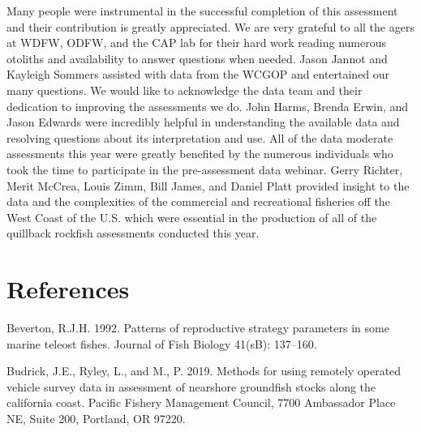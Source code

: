 \documentclass[11pt,
  english,
  letterpaper,
]{article}
\begin{document}
\leavevmode\tagmcend\tagstructend


Many people were instrumental in the successful completion of this assessment and their contribution is greatly appreciated. We are very grateful to all the agers at WDFW, ODFW, and the CAP lab for their hard work reading numerous otoliths and availability to answer questions when needed. Jason Jannot and Kayleigh Sommers assisted with data from the WCGOP and entertained our many questions. We would like to acknowledge the data team and their dedication to improving the assessments we do. John Harms, Brenda Erwin, and Jason Edwards were incredibly helpful in understanding the available data and resolving questions about its interpretation and use. All of the data moderate assessments this year were greatly benefited by the numerous individuals who took the time to participate in the pre-assessment data webinar. Gerry Richter, Merit McCrea, Louis Zimm, Bill James, and Daniel Platt provided insight to the data and the complexities of the commercial and recreational fisheries off the West Coast of the U.S. which were essential in the production of all of the quillback rockfish assessments conducted this year.

\leavevmode\tagmcend\tagstructend\par

\clearpage


\hypertarget{references}{%
\section{References}\label{references}}

\leavevmode\tagmcend\tagstructend


\hypertarget{refs}{}
\leavevmode\hypertarget{ref-Beverton_1992}{}%
Beverton, R.J.H. 1992. Patterns of reproductive strategy parameters in some marine teleost fishes. Journal of Fish Biology 41(sB): 137--160.

\leavevmode\hypertarget{ref-Budricketal_rov_2019}{}%
Budrick, J.E., Ryley, L., and M., P. 2019. Methods for using remotely operated vehicle survey data in assessment of nearshore groundfish stocks along the california coast. Pacific Fishery Management Council, 7700 Ambassador Place NE, Suite 200, Portland, OR 97220.
\end{document}
